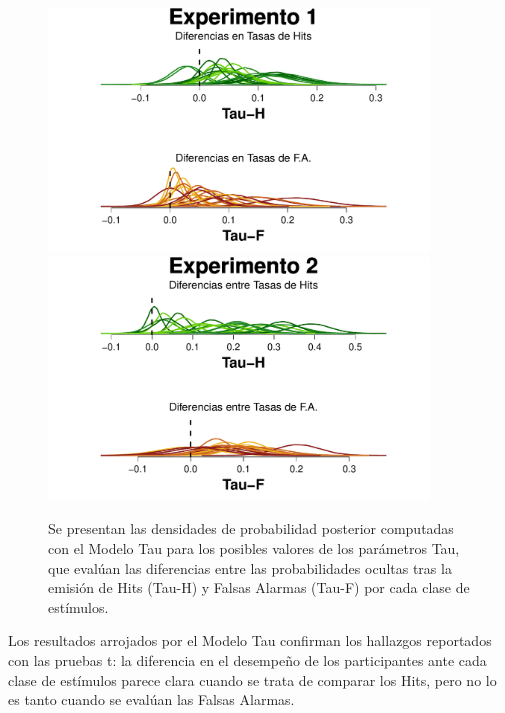 \begin{figure}[p]
\centering
\includegraphics[width=0.9\textwidth]{Figures/MTau_DensidadTau_E1} \\ 
\includegraphics[width=0.9\textwidth]{Figures/MTau_DensidadTau_E2}\\
\decoRule
\caption[Modelo Tau: Densidad de probabilidad posterior para los posibles valores de los parámetros Tau]{Se presentan las densidades de probabilidad posterior computadas con el Modelo Tau para los posibles valores de los parámetros Tau, que evalúan las diferencias entre las probabilidades ocultas tras la emisión de Hits (Tau-H) y Falsas Alarmas (Tau-F) por cada clase de estímulos.}
\label{fig:Tau}
\end{figure}

Los resultados arrojados por el Modelo Tau confirman los hallazgos reportados con las pruebas t: la diferencia en el desempeño de los participantes ante cada clase de estímulos parece clara cuando se trata de comparar los Hits, pero no lo es tanto cuando se evalúan las Falsas Alarmas.\\

